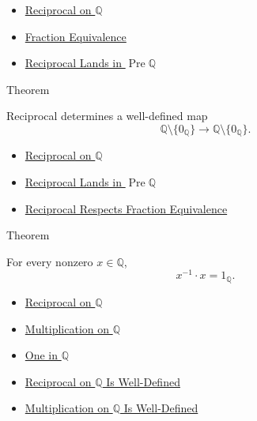 \begin{dependencies}
\begin{itemize}
  \item \hyperref[def:reciprocal-on-q-classes]{Reciprocal on $\mathbb{Q}$}
  \item \hyperref[def:fraction-equivalence]{Fraction Equivalence}
  \item \hyperref[lem:reciprocal-denominator-nonzero-q]{Reciprocal Lands in $\operatorname{Pre}\mathbb{Q}$}
\end{itemize}
\end{dependencies}

\begin{theorembox}{Theorem}
\begin{theorem}
\label{thm:reciprocal-on-q-well-defined}
Reciprocal determines a well-defined map
\[
\mathbb{Q}\setminus\{0_{\mathbb{Q}}\}\to\mathbb{Q}\setminus\{0_{\mathbb{Q}}\}.
\]
\end{theorem}
\end{theorembox}

\begin{dependencies}
\begin{itemize}
  \item \hyperref[def:reciprocal-on-q-classes]{Reciprocal on $\mathbb{Q}$}
  \item \hyperref[lem:reciprocal-denominator-nonzero-q]{Reciprocal Lands in $\operatorname{Pre}\mathbb{Q}$}
  \item \hyperref[lem:reciprocal-on-q-respects-equivalence]{Reciprocal Respects Fraction Equivalence}
\end{itemize}
\end{dependencies}

\begin{theorembox}{Theorem}
\begin{theorem}
\label{thm:reciprocal-left-multiplicative-inverse-on-q}
For every nonzero $x\in\mathbb{Q}$,
\[
x^{-1}\cdot x=1_{\mathbb{Q}}.
\]
\end{theorem}
\end{theorembox}

\begin{dependencies}
\begin{itemize}
  \item \hyperref[def:reciprocal-on-q-classes]{Reciprocal on $\mathbb{Q}$}
  \item \hyperref[def:multiplication-on-q-classes]{Multiplication on $\mathbb{Q}$}
  \item \hyperref[def:one-in-q]{One in $\mathbb{Q}$}
  \item \hyperref[thm:reciprocal-on-q-well-defined]{Reciprocal on $\mathbb{Q}$ Is Well-Defined}
  \item \hyperref[thm:multiplication-on-q-well-defined]{Multiplication on $\mathbb{Q}$ Is Well-Defined}
\end{itemize}
\end{dependencies}

